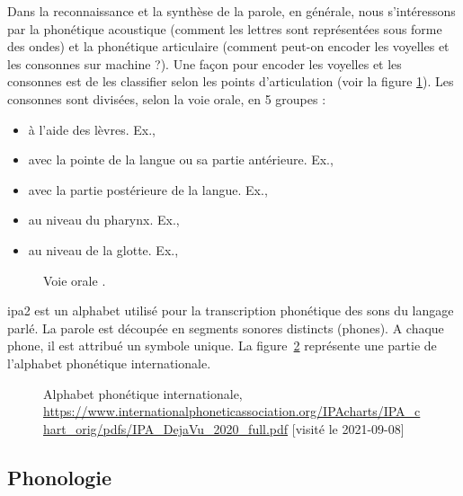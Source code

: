 \documentclass{KodeBook}
\begin{document}
Dans la reconnaissance et la synthèse de la parole, en générale, nous s'intéressons par la phonétique acoustique (comment les lettres sont représentées sous forme des ondes) et la phonétique articulaire (comment peut-on encoder les voyelles et les consonnes sur machine ?).
Une façon pour encoder les voyelles et les consonnes est de les classifier selon les points d'articulation (voir la figure \ref{fig:articulation}). 
Les consonnes sont divisées, selon la voie orale, en 5 groupes :
\begin{itemize}
	\item {} à l'aide des lèvres. Ex., \expword{\textipa{[b], [p], [m], [f], [v]}}
	\item {} avec la pointe de la langue ou sa partie antérieure. 
	Ex., 
	\item {} avec la partie postérieure de la langue. Ex., 
	\item {} au niveau du pharynx. 
	Ex., 
	\item {} au niveau de la glotte. 
	Ex., 
\end{itemize}

\begin{figure}[!ht]
	\centering 
	\caption[Voie orale]{Voie orale \cite{2009-ball}. \label{fig:articulation}}
\end{figure}

\ac{ipa2} est un alphabet utilisé pour la transcription phonétique des sons du langage parlé.  
La parole est découpée en segments sonores distincts (phones). 
A chaque phone, il est attribué un symbole unique. 
La figure~\ref{fig:ipa} représente une partie de l'alphabet phonétique internationale.

\begin{figure}[!ht]
	\centering 
	\caption[Alphabet phonétique internationale : IPA]{Alphabet phonétique internationale, \url{https://www.internationalphoneticassociation.org/IPAcharts/IPA_chart_orig/pdfs/IPA_DejaVu_2020_full.pdf} [visité le 2021-09-08]}
	\label{fig:ipa}
\end{figure}


\subsection{Phonologie}
\end{document}
